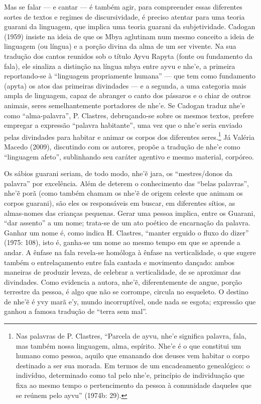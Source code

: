 Mas se falar --- e cantar --- é também agir, para compreender essas
diferentes sortes de textos e regimes de discursividade, é preciso
atentar para uma teoria guarani da linguagem, que implica uma teoria
guarani da subjetividade. Cadogan (1959) insiste na ideia de que os
Mbya aglutinam num mesmo conceito a ideia de linguagem (ou língua) e a
porção divina da alma de um ser vivente. Na sua tradução dos cantos
reunidos sob o título Ayvu Rapyta (fonte ou fundamento da fala), ele
sinaliza a distinção na língua mbya entre ayvu e nhe’e, a primeira
reportando-se à ``linguagem propriamente humana'' --- que tem como
fundamento (apyta) os atos das primeiras divindades --- e a segunda, a
uma categoria mais ampla de linguagem, capaz de abranger o canto dos
pássaros e o chiar de outros animais, seres semelhantemente portadores
de nhe’e. Se Cadogan traduz nhe’e como ``alma-palavra'', P. Clastres,
debruçando-se sobre os mesmos textos, prefere empregar a expressão
``palavra habitante'', uma vez que o nhe’e seria enviado pelas divindades
para habitar e animar os corpos dos diferentes seres.\footnote{Nas
palavras de P. Clastres, ``Parcela de ayvu, nhe’e significa palavra,
fala, mas também nossa linguagem, alma, espírito. Nhe’e é o que
constitui um humano como pessoa, aquilo que emanando dos deuses vem
habitar o corpo destinado a ser sua morada. Em termos de um
encadeamento genealógico: o indivíduo, determinado como tal pelo nhe’e,
princípio de individuação que fixa ao mesmo tempo o pertencimento da
pessoa à comunidade daqueles que se reúnem pelo ayvu'' (1974b: 29).} Já
Valéria Macedo (2009), discutindo com os autores, propõe a tradução de
nhe’e como ``linguagem afeto'', sublinhando seu caráter agentivo e mesmo
material, corpóreo. 

Os sábios guarani seriam, de todo modo, nhe’ẽ jara, os
``mestres/donos da palavra'' por excelência. Além de deterem o
conhecimento das ``belas palavras'', nhe’ẽ porã (como também chamam
os nhe’ẽ de origem celeste que animam os corpos guarani), são
eles os responsáveis em buscar, em diferentes sítios, as almas-nomes
das crianças pequenas. Gerar uma pessoa implica, entre os Guarani, ``dar
assento'' a um nome; trata-se de um ato poético de encarnação da
palavra. Ganhar um nome é, como indica H. Clastres, ``manter erguido o
fluxo do dizer'' (1975: 108), isto é, ganha-se um nome ao mesmo tempo em
que se aprende a andar. A ênfase na fala revela-se homóloga à ênfase na
verticalidade, o que sugere também o entrelaçamento entre fala cantada
e movimento dançado: ambos maneiras de produzir leveza, de celebrar a
verticalidade, de se aproximar das divindades. Como evidencia a autora,
nhe’ẽ, diferentemente de angue, porção terrestre da pessoa, é
algo que não se corrompe, circula no esqueleto. O destino de
nhe’ẽ é yvy marã e’y, mundo incorruptível, onde nada se esgota;
expressão que ganhou a famosa tradução de ``terra sem mal''.

